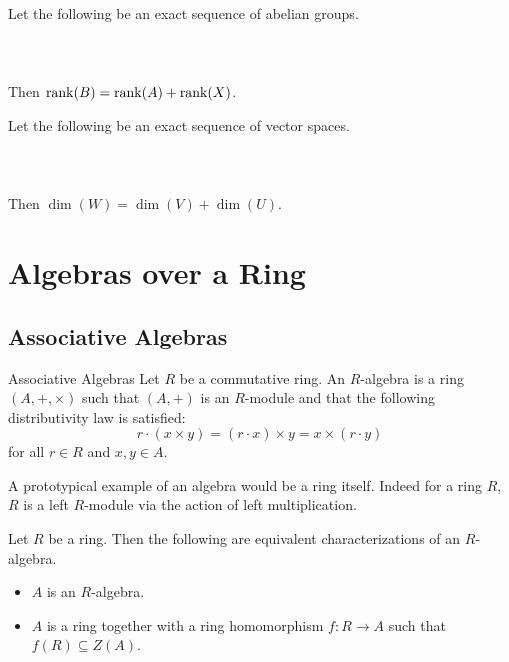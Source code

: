 \documentclass[a4paper]{article}
\begin{document}
\begin{lmm}{}{} Let the following be an exact sequence of abelian groups. \\~\\
\\~\\
Then $\rank(B)=\rank(A)+\rank(X)$. 
\end{lmm}

\begin{lmm}{}{} Let the following be an exact sequence of vector spaces. \\~\\
\\~\\
Then $\dim(W)=\dim(V)+\dim(U)$. 
\end{lmm}
\pagebreak
\section{Algebras over a Ring}
\subsection{Associative Algebras}
\begin{defn}{Associative Algebras}{} Let $R$ be a commutative ring. An $R$-algebra is a ring $(A,+,\times)$ such that $(A,+)$ is an $R$-module and that the following distributivity law is satisfied: $$r\cdot(x\times y)=(r\cdot x)\times y=x\times(r\cdot y)$$ for all $r\in R$ and $x,y\in A$. 
\end{defn}

A prototypical example of an algebra would be a ring itself. Indeed for a ring $R$, $R$ is a left $R$-module via the action of left multiplication. 

\begin{prp}{}{} Let $R$ be a ring. Then the following are equivalent characterizations of an $R$-algebra. 
\begin{itemize}
\item $A$ is an $R$-algebra. 
\item $A$ is a ring together with a ring homomorphism $f:R\to A$ such that $f(R)\subseteq Z(A)$. 
\end{itemize}
\end{prp}
\end{document}
